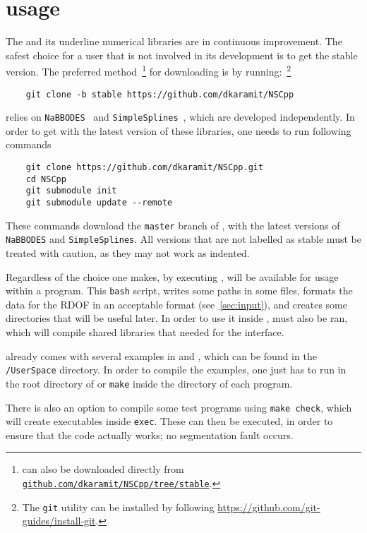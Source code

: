 \documentclass[11pt,a4paper]{article}
\begin{document}
\section{\nsc usage}\label{sec:first_steps}
\setcounter{equation}{0}
%
The \nsc and its underline numerical libraries are in continuous improvement. The safest choice for a user that is not involved in its development is to get the stable version. The preferred method~\footnote{\nsc can also be downloaded directly from \href{https://github.com/dkaramit/NSCpp/tree/stable}{\tt github.com/dkaramit/NSCpp/tree/stable}.} for downloading \nsc is by running:~\footnote{The {\tt git} utility can be installed by following \href{https://github.com/git-guides/install-git}{https://github.com/git-guides/install-git}.}
%
\begin{lstlisting}
	git clone -b stable https://github.com/dkaramit/NSCpp
\end{lstlisting}

\nsc relies on {\tt NaBBODES}~\cite{NaBBODES} and {\tt SimpleSplines}~\cite{SimpleSplines}, which are developed independently. In order to get \nsc with the latest version of these libraries, one needs to run following commands
%
\begin{lstlisting}
	git clone https://github.com/dkaramit/NSCpp.git
	cd NSCpp
	git submodule init
	git submodule update --remote
\end{lstlisting}
%
These commands download the {\tt master} branch of \nsc, with the latest versions of {\tt NaBBODES} and {\tt SimpleSplines}. All versions that are not labelled as stable must be treated with caution, as they may not work as indented. 

Regardless of the choice one makes, by executing , \nsc will be available for usage within a \CPP program. This {\tt bash} script, writes some paths in some files, formats the data for the RDOF in an acceptable format (see~\ref{sec:input}), and creates some directories that will be useful later.
%
In order to use it inside \PY,  must also be ran,  which will compile shared libraries that needed for the \PY interface.

\nsc already comes with several examples in \CPP and \PY, which can be found in the {\tt \nsc/UserSpace} directory. In order to compile the \CPP examples, one just has to run   in the root directory of \nsc or {\tt make} inside the directory of each \CPP program.


There is also an option to compile some test programs using {\tt make check}, which will create executables inside {\tt exec}. These can then be executed, in order to ensure that the code actually works; \eg no segmentation fault occurs. 
\end{document}
